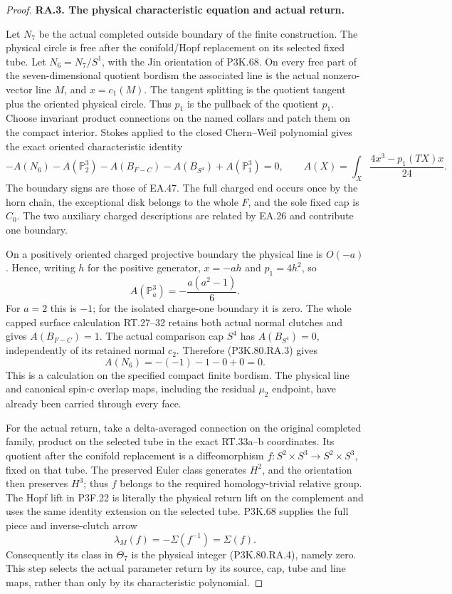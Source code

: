 \begin{proof}
\par\medskip\noindent\textbf{RA.3. The physical characteristic equation and actual return.}\par\nopagebreak[4]

Let \(N_7\) be the actual completed outside boundary of the
finite construction. The physical circle is free after
the conifold/Hopf replacement on its selected fixed tube.
Let \(N_6=N_7/S^1\), with the Jin orientation of P3K.68.
On every free part of the seven-dimensional quotient
bordism the associated line is the actual nonzero-vector
line \(M\), and \(x=c_1(M)\). The tangent splitting is the
quotient tangent plus the oriented physical circle. Thus
\(p_1\) is the pullback of the quotient \(p_1\).
Choose invariant product connections on the named collars
and patch them on the compact interior. Stokes applied
to the closed Chern--Weil polynomial gives the exact
oriented characteristic identity
\[
 -A(N_6)-A(\mathbb P^3_2)
       -A(B_{F-C})-A(B_{S^4})+A(\mathbb P^3_1)=0,
 \qquad
 A(X)=\int_X\frac{4x^3-p_1(TX)x}{24}.             \tag{P3K.80.RA.3}
\]
The boundary signs are those of EA.47. The full charged
end occurs once by the horn chain, the exceptional disk
belongs to the whole \(F\), and the sole fixed cap is \(C_0\).
The two auxiliary charged descriptions are related by
EA.26 and contribute one boundary.

On a positively oriented charged projective boundary the
physical line is \(O(-a)\). Hence, writing \(h\) for the
positive generator, \(x=-a h\) and \(p_1=4h^2\), so
\[
 A(\mathbb P^3_a)=-\frac{a(a^2-1)}6.
\]
For \(a=2\) this is \(-1\); for the isolated charge-one
boundary it is zero. The whole capped surface calculation
RT.27--32 retains both actual normal clutches and gives
\(A(B_{F-C})=1\). The actual comparison cap \(S^4\) has
\(A(B_{S^4})=0\), independently of its retained normal
\(c_2\). Therefore (P3K.80.RA.3) gives
\[
                     A(N_6)=-(-1)-1-0+0=0.      \tag{P3K.80.RA.4}
\]
This is a calculation on the specified compact finite
bordism. The physical line and canonical spin-c overlap
maps, including the residual \(\mu_2\) endpoint, have
already been carried through every face.

For the actual return, take a delta-averaged connection on
the original completed family, product on the selected
tube in the exact RT.33a--b coordinates. Its quotient after
the conifold replacement is a diffeomorphism
\(f:S^2\times S^3\to S^2\times S^3\), fixed on that tube.
The preserved Euler class generates \(H^2\), and the
orientation then preserves \(H^3\); thus \(f\) belongs to
the required homology-trivial relative group.
The Hopf lift in P3F.22 is literally the physical return
lift on the complement and uses the same identity
extension on the selected tube. P3K.68 supplies the full
piece and inverse-clutch arrow
\[
       \lambda_M(f)=-\Sigma(f^{-1})=\Sigma(f).
\]
Consequently its class in \(\Theta_7\) is the physical
integer (P3K.80.RA.4), namely zero. This step selects the
actual parameter return by its source, cap, tube and
line maps, rather than only by its characteristic polynomial.


\end{proof}
